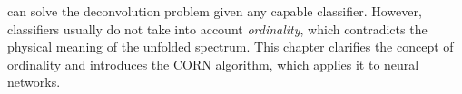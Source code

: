 \dsea{} can solve the deconvolution problem
given any capable classifier.
However,
  classifiers usually do not take into account \emph{ordinality},
which contradicts the physical meaning of the unfolded spectrum.
%
This chapter
  clarifies the concept of ordinality
  and
  introduces the \ac{CORN} algorithm,
    which applies it to neural networks.
